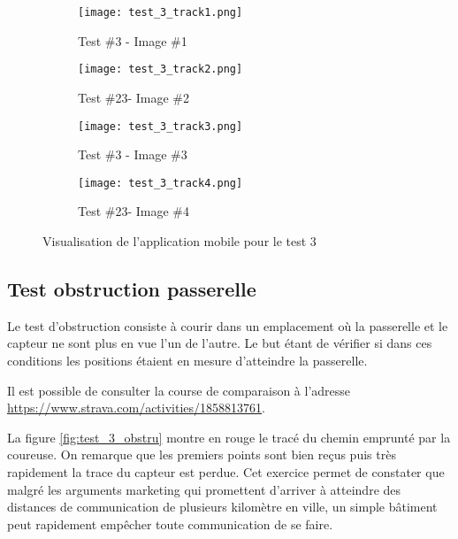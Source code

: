 \begin{figure}[tb]
\centering
\begin{subfigure}{0.7\textwidth}
  \centering
  \texttt{[image: test\_3\_track1.png]}
  \caption{Test \#3 - Image \#1}
  \label{fig:test_3_track1}
\end{subfigure}%

\begin{subfigure}{0.7\textwidth}
  \centering
  \texttt{[image: test\_3\_track2.png]}
  \caption{Test \#23- Image \#2}
  \label{fig:test_3_track2}
\end{subfigure}

\begin{subfigure}{0.7\textwidth}
  \centering
  \texttt{[image: test\_3\_track3.png]}
  \caption{Test \#3 - Image \#3}
  \label{fig:test_3_track3}
\end{subfigure}%

\begin{subfigure}{0.7\textwidth}
  \centering
  \texttt{[image: test\_3\_track4.png]}
  \caption{Test \#23- Image \#4}
  \label{fig:test_3_track4}
\end{subfigure}
\caption{Visualisation de l'application mobile pour le test 3}
\label{fig:test_3}
\end{figure}

\subsection{Test obstruction passerelle}\label{ch:test_obstru}

Le test d'obstruction consiste à courir dans un emplacement où la passerelle et le capteur ne sont plus en vue l'un de l'autre. Le but étant de vérifier si dans ces conditions les positions étaient en mesure d'atteindre la passerelle.

Il est possible de consulter la course de comparaison à l'adresse \url{https://www.strava.com/activities/1858813761}.

La figure \ref{fig:test_3_obstru} montre en rouge le tracé du chemin emprunté par la coureuse. On remarque que les premiers points sont bien reçus puis très rapidement la trace du capteur est perdue. Cet exercice permet de constater que malgré les arguments marketing qui promettent d'arriver à atteindre des distances de communication de plusieurs kilomètre en ville, un simple bâtiment peut rapidement empêcher toute communication de se faire.


